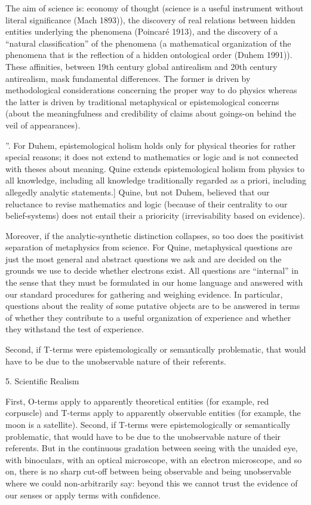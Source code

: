 The aim of science is: economy of thought (science is a useful instrument
without literal significance (Mach 1893)), the discovery of real relations
between hidden entities underlying the phenomena (Poincaré 1913), and the
discovery of a “natural classification” of the phenomena (a mathematical
organization of the phenomena that is the reflection of a hidden ontological
order (Duhem 1991)). These affinities, between 19th century global antirealism
and 20th century antirealism, mask fundamental differences. The former is driven
by methodological considerations concerning the proper way to do physics whereas
the latter is driven by traditional metaphysical or epistemological concerns
(about the meaningfulness and credibility of claims about goings-on behind the
veil of appearances).

”. For Duhem, epistemological holism holds only for physical theories for rather
special reasons; it does not extend to mathematics or logic and is not connected
with theses about meaning. Quine extends epistemological holism from physics to
all knowledge, including all knowledge traditionally regarded as a priori,
including allegedly analytic statements.] Quine, but not Duhem, believed that
our reluctance to revise mathematics and logic (because of their centrality to
our belief-systems) does not entail their a prioricity (irrevisability based on
evidence).

Moreover, if the analytic-synthetic distinction collapses, so too does the
positivist separation of metaphysics from science. For Quine, metaphysical
questions are just the most general and abstract questions we ask and are
decided on the grounds we use to decide whether electrons exist. All questions
are “internal” in the sense that they must be formulated in our home language
and answered with our standard procedures for gathering and weighing evidence.
In particular, questions about the reality of some putative objects are to be
answered in terms of whether they contribute to a useful organization of
experience and whether they withstand the test of experience.

Second, if T-terms were epistemologically or semantically problematic, that
would have to be due to the unobservable nature of their referents.


5. Scientific Realism

First, O-terms apply to apparently theoretical entities (for example, red
corpuscle) and T-terms apply to apparently observable entities (for example, the
moon is a satellite). Second, if T-terms were epistemologically or semantically
problematic, that would have to be due to the unobservable nature of their
referents. But in the continuous gradation between seeing with the unaided eye,
with binoculars, with an optical microscope, with an electron microscope, and so
on, there is no sharp cut-off between being observable and being unobservable
where we could non-arbitrarily say: beyond this we cannot trust the evidence of
our senses or apply terms with confidence.


